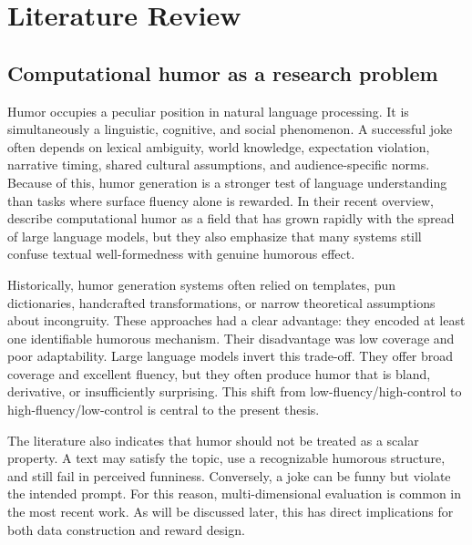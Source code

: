 \documentclass[14pt,a4paper]{extreport}
\begin{document}
\chapter{Literature Review}

\section{Computational humor as a research problem}

Humor occupies a peculiar position in natural language processing. It is simultaneously a linguistic, cognitive, and social phenomenon. A successful joke often depends on lexical ambiguity, world knowledge, expectation violation, narrative timing, shared cultural assumptions, and audience-specific norms. Because of this, humor generation is a stronger test of language understanding than tasks where surface fluency alone is rewarded. In their recent overview, \citet{Loakman2025} describe computational humor as a field that has grown rapidly with the spread of large language models, but they also emphasize that many systems still confuse textual well-formedness with genuine humorous effect.

Historically, humor generation systems often relied on templates, pun dictionaries, handcrafted transformations, or narrow theoretical assumptions about incongruity. These approaches had a clear advantage: they encoded at least one identifiable humorous mechanism. Their disadvantage was low coverage and poor adaptability. Large language models invert this trade-off. They offer broad coverage and excellent fluency, but they often produce humor that is bland, derivative, or insufficiently surprising. This shift from low-fluency/high-control to high-fluency/low-control is central to the present thesis.

The literature also indicates that humor should not be treated as a scalar property. A text may satisfy the topic, use a recognizable humorous structure, and still fail in perceived funniness. Conversely, a joke can be funny but violate the intended prompt. For this reason, multi-dimensional evaluation is common in the most recent work. As will be discussed later, this has direct implications for both data construction and reward design.

\end{document}
